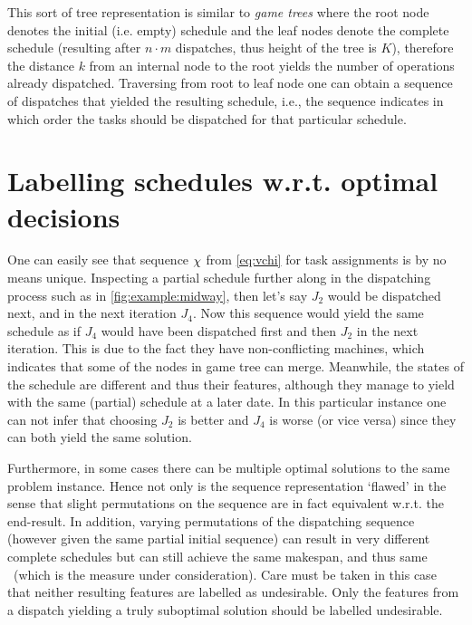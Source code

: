 This sort of tree representation is similar to \emph{game trees} 
\citep[cf.][]{Rosen03} where the root node denotes the initial (i.e. empty) 
schedule and the leaf nodes denote the complete schedule (resulting after 
$n\cdot m$ dispatches, thus height of the tree is $K$), therefore the 
distance $k$ from an internal node to the root yields the number of operations 
already dispatched. Traversing from root to leaf node one can obtain a sequence 
of dispatches that yielded the resulting schedule, i.e., the sequence indicates 
in which order the tasks should be dispatched for that particular schedule. 

\section{Labelling schedules w.r.t. optimal decisions} 
One can easily see that sequence ${\mathbf{\chi}}$ from \cref{eq:vchi} for task 
assignments is by no means unique. 
Inspecting a partial schedule further along in the dispatching process such as 
in \cref{fig:example:midway}, then let's say $J_2$ would be dispatched next, 
and in the next iteration $J_4$. 
Now this sequence would yield the same schedule as if $J_4$ would have been 
dispatched first and then $J_2$ in the next iteration. 
This is due to the fact they have non-conflicting machines, which indicates 
that some of the nodes in game tree can merge. 
Meanwhile, the states of the schedule are different and thus their 
features, although they manage to yield with the same (partial) schedule at a 
later date.  %
In this particular instance one can not infer that choosing $J_2$ is better and 
$J_4$ is worse (or vice versa) since they can both yield the same solution.

Furthermore, in some cases there can be multiple optimal solutions to the same 
problem instance. 
Hence not only is the sequence representation `flawed' in the sense that slight 
permutations on the sequence are in fact equivalent w.r.t. the end-result.
In addition, varying permutations of the dispatching sequence (however given 
the same partial initial sequence) can result in very different complete 
schedules but can still achieve the same makespan, and thus same \fullnamerho\ 
(which is the measure under consideration). 
Care must be taken in this case that neither resulting features are labelled as 
undesirable. 
Only the features from a dispatch yielding a truly suboptimal solution should 
be labelled undesirable. 

